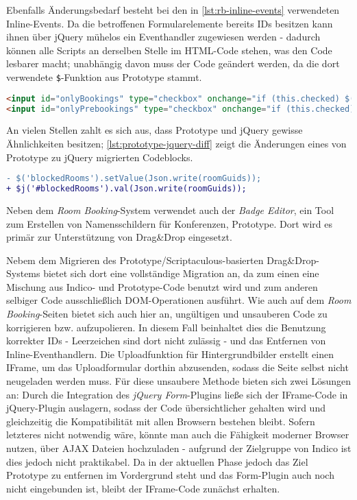 Ebenfalls Änderungsbedarf besteht bei den in \autoref{lst:rb-inline-events} verwendeten
Inline-Events. Da die betroffenen Formularelemente bereits IDs besitzen kann ihnen über jQuery
mühelos ein Eventhandler zugewiesen werden - dadurch können alle Scripts an derselben Stelle im
HTML-Code stehen, was den Code lesbarer macht; unabhängig davon muss der Code geändert werden, da
die dort verwendete \lstinline{$}-Funktion aus Prototype stammt.

\begin{lstlisting}[language=HTML,label=lst:rb-inline-events,caption=Inline-Eventhandler]
<input id="onlyBookings" type="checkbox" onchange="if (this.checked) $('onlyPrebookings').checked = false;"/>
<input id="onlyPrebookings" type="checkbox" onchange="if (this.checked) $('onlyBookings').checked = false;" />
\end{lstlisting}

An vielen Stellen zahlt es sich aus, dass Prototype und jQuery gewisse Ähnlichkeiten besitzen;
\autoref{lst:prototype-jquery-diff} zeigt die Änderungen eines von Prototype zu jQuery migrierten
Codeblocks.

\begin{lstlisting}[language=diff,label=lst:prototype-jquery-diff,caption=Ähnlichkeit zwischen jQuery und Prototype]
- $('blockedRooms').setValue(Json.write(roomGuids));
+ $j('#blockedRooms').val(Json.write(roomGuids));
\end{lstlisting}

Neben dem \emph{Room Booking}-System verwendet auch der \emph{Badge Editor}, ein Tool zum Erstellen
von Namensschildern für Konferenzen, Prototype. Dort wird es primär zur Unterstützung von Drag\&Drop
eingesetzt.


Nebem dem Migrieren des Prototype/Scriptaculous-basierten Drag\&Drop-Systems bietet sich dort eine
vollständige Migration an, da zum einen eine Mischung aus Indico- und Prototype-Code benutzt wird
und zum anderen selbiger Code ausschließlich DOM-Operationen ausführt. Wie auch auf dem \emph{Room
Booking}-Seiten bietet sich auch hier an, ungültigen und unsauberen Code zu korrigieren bzw.
aufzupolieren. In diesem Fall beinhaltet dies die Benutzung korrekter IDs - Leerzeichen sind dort
nicht zulässig - und das Entfernen von Inline-Eventhandlern. Die Uploadfunktion für
Hintergrundbilder erstellt einen IFrame, um das Uploadformular dorthin abzusenden, sodass die Seite
selbst nicht neugeladen werden muss. Für diese unsaubere Methode bieten sich zwei Lösungen an: Durch
die Integration des \emph{jQuery Form}-Plugins ließe sich der IFrame-Code in jQuery-Plugin
auslagern, sodass der Code übersichtlicher gehalten wird und gleichzeitig die Kompatibilität mit
allen Browsern bestehen bleibt. Sofern letzteres nicht notwendig wäre, könnte man auch die Fähigkeit
moderner Browser nutzen, über AJAX Dateien hochzuladen - aufgrund der Zielgruppe von Indico ist dies
jedoch nicht praktikabel. Da in der aktuellen Phase jedoch das Ziel Prototype zu entfernen im
Vordergrund steht und das Form-Plugin auch noch nicht eingebunden ist, bleibt der IFrame-Code
zunächst erhalten.

